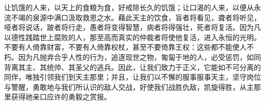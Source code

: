 让饥饿的人来，以天上的食粮为食，好戒除长久的饥饿；让口渴的人来，以便从永流不竭的泉源中满口汲取救恩之水。藉此天主的饮食，盲者将看见，聋者将听见，哑者将说话，跛者将行走，愚者将变得智慧，病者将得强壮，死者将复活。因为凡以德性践踏世上腐败的人，那至高而真实的仲裁者将使他复活，进入永恒的光明。不要有人倚靠财富，不要有人倚靠权杖，甚至不要倚靠王权：这些都不能使人不朽。因为凡抛弃合乎人性的行为，追逐现世之物，匍匐于地的人，必受惩罚，如同背离其主、其统帅、其圣父的逃兵。因此，让我们致力于正义，它能如不可分离的同伴，唯独引领我们到天主那里；并且，让我们以不懈的服事服事天主，坚守岗位与警醒，勇敢地与我们所认识的敌人交战，好使我们战胜仇敌，凯旋得胜，从主那里获得祂亲口应许的勇毅之赏报。\par

